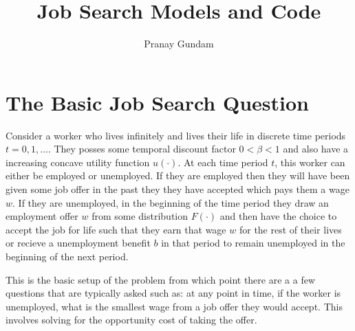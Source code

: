 \documentclass[11pt,english]{article}
\title{\textbf{Job Search Models and Code}}
\author{Pranay Gundam}
\begin{document}
\maketitle

\section{The Basic Job Search Question}

Consider a worker who lives infinitely and lives their life in discrete time periods $t=0,1,\ldots$. They posses some temporal discount factor $0 < \beta < 1$ and also have a increasing concave utility function $u(\cdot)$. At each time period $t$, this worker can either be employed or unemployed. If they are employed then they will have been given some job offer in the past they they have accepted which pays them a wage $w$. If they are unemployed, in the beginning of the time period they draw an employment offer $w$ from some distribution $F(\cdot)$ and then have the choice to accept the job for life such that they earn that wage $w$ for the rest of their lives or recieve a unemployment benefit $b$ in that period to remain unemployed in the beginning of the next period.

This is the basic setup of the problem from which point there are a a few questions that are typically asked such as: at any point in time, if the worker is unemployed, what is the smallest wage from a job offer they would accept. This involves solving for the opportunity cost of taking the offer.
\end{document}
